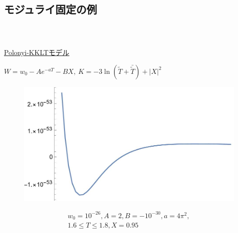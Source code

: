 \documentclass[
  a4paper,uplatex,dvipdfmx,9pt,
  xcolor = {dvipsnames,svgnames},
  hyperref ={colorlinks=true,citecolor=Navy,linkcolor=NavyBlue,urlcolor=purple}
]{beamer}
\begin{document}
\begin{frame}[plain]

\end{frame}


\subsection{モジュライ固定の例}

\begin{frame}[plain]
  \frametitle{\thesubsection\ \subsecname}

  \uline{Polonyi-KKLTモデル}
  \begin{center}
    $
      \displaystyle
      W
      =
      w_{0}
      -
      A
      e^{-aT}
      -
      B
      X
      ,\ 
      K
      =
      -
      3\ln (\tilde{T}+\bar{\tilde{T}})
      +
      |X|^2
    $
  \end{center}
  \begin{figure}
    \centering
    \includegraphics[keepaspectratio,width=0.6\linewidth]{fig/reference_point/plomyi_kklt.jpg}
  \end{figure}
    \begin{gather}
      w_{0}=10^{-26}, A=2, B=-10^{-30}, a=4\pi^2, 
      \nonumber
      \\
      1.6\leq T\leq 1.8, X=0.95
      \nonumber
    \end{gather}
  
\end{frame}
\end{document}
